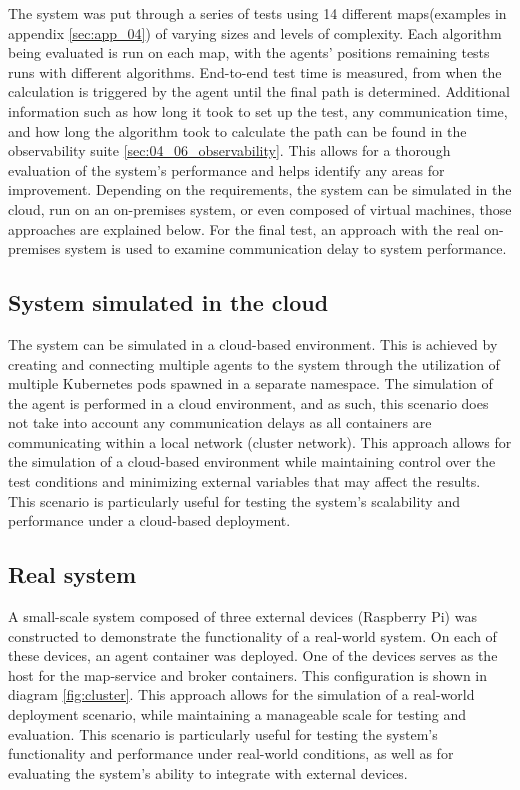 The system was put through a series of tests using 14 different maps(examples in appendix \ref{sec:app_04}) of varying sizes and levels of complexity. Each algorithm being evaluated is run on each map, with the agents' positions remaining tests runs with different algorithms. End-to-end test time is measured, from when the calculation is triggered by the agent until the final path is determined. Additional information such as how long it took to set up the test, any communication time, and how long the algorithm took to calculate the path can be found in the observability suite \ref{sec:04_06_observability}. This allows for a thorough evaluation of the system's performance and helps identify any areas for improvement. Depending on the requirements, the system can be simulated in the cloud, run on an on-premises system, or even composed of virtual machines, those approaches are explained below. For the final test, an approach with the real on-premises system is used to examine communication delay to system performance.

\subsection{System simulated in the cloud}
The system can be simulated in a cloud-based environment. This is achieved by creating and connecting multiple agents to the system through the utilization of multiple Kubernetes pods spawned in a separate namespace. The simulation of the agent is performed in a cloud environment, and as such, this scenario does not take into account any communication delays as all containers are communicating within a local network (cluster network). This approach allows for the simulation of a cloud-based environment while maintaining control over the test conditions and minimizing external variables that may affect the results. This scenario is particularly useful for testing the system's scalability and performance under a cloud-based deployment.

\subsection{Real system}
A small-scale system composed of three external devices (Raspberry Pi) was constructed to demonstrate the functionality of a real-world system. On each of these devices, an agent container was deployed. One of the devices serves as the host for the map-service and broker containers. This configuration is shown in diagram \ref{fig:cluster}. This approach allows for the simulation of a real-world deployment scenario, while maintaining a manageable scale for testing and evaluation. This scenario is particularly useful for testing the system's functionality and performance under real-world conditions, as well as for evaluating the system's ability to integrate with external devices.

